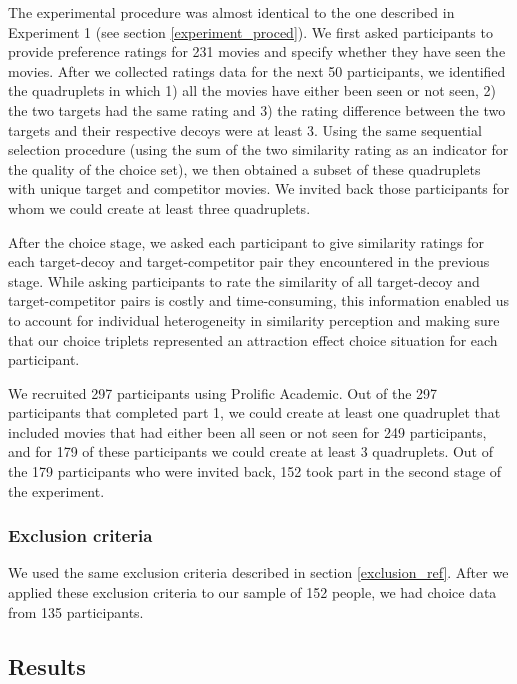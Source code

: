 \documentclass[11pt,a4paper]{article}
\begin{document}
The experimental procedure was almost identical to the one described in Experiment 1 (see section \ref{experiment_proced}). We first asked participants to provide preference ratings for 231 movies and specify whether they have seen the movies. After we collected ratings data for the next 50 participants, we identified the quadruplets in which 1) all the movies have either been seen or not seen, 2) the two targets had the same rating and 3) the rating difference between the two targets and their respective decoys were at least 3. Using the same sequential selection procedure (using the sum of the two similarity rating as an indicator for the quality of the choice set), we then obtained a subset of these quadruplets with unique target and competitor movies. We invited back those participants for whom we could create at least three quadruplets.

After the choice stage, we asked each participant to give similarity ratings for each target-decoy and target-competitor pair they encountered in the previous stage. While asking participants to rate the similarity of all target-decoy and target-competitor pairs is costly and time-consuming, this information enabled us to account for individual heterogeneity in similarity perception and making sure that our choice triplets represented an attraction effect choice situation for each participant. 

 We recruited 297 participants using Prolific Academic. Out of the 297 participants that completed part 1, we could create at least one quadruplet that included movies that had either been all seen or not seen for 249 participants, and for 179 of these participants we could create at least 3 quadruplets. Out of the 179 participants who were invited back, 152 took part in the second stage of the experiment.  

\subsubsection{Exclusion criteria}

 We used the same exclusion criteria described in section \ref{exclusion_ref}. After we applied these exclusion criteria to our sample of 152 people, we had choice data from 135 participants.

\subsection{Results}
\end{document}
